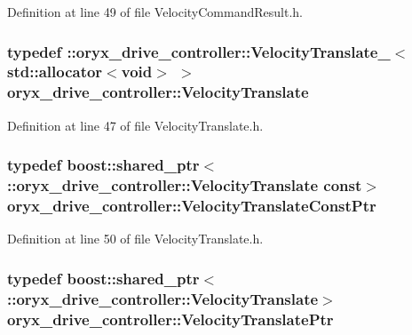 \-Definition at line 49 of file \-Velocity\-Command\-Result.\-h.

\subsubsection[{\-Velocity\-Translate}]{\setlength{\rightskip}{0pt plus 5cm}typedef \-::{\bf oryx\-\_\-drive\-\_\-controller\-::\-Velocity\-Translate\-\_\-}$<$std\-::allocator$<$void$>$ $>$ {\bf oryx\-\_\-drive\-\_\-controller\-::\-Velocity\-Translate}}\label{namespaceoryx__drive__controller_ad13b4105d91451512c0f16674d209a41}


\-Definition at line 47 of file \-Velocity\-Translate.\-h.

\subsubsection[{\-Velocity\-Translate\-Const\-Ptr}]{\setlength{\rightskip}{0pt plus 5cm}typedef boost\-::shared\-\_\-ptr$<$ \-::{\bf oryx\-\_\-drive\-\_\-controller\-::\-Velocity\-Translate} const$>$ {\bf oryx\-\_\-drive\-\_\-controller\-::\-Velocity\-Translate\-Const\-Ptr}}\label{namespaceoryx__drive__controller_a08f44e7cdd4ff4146f607fb97b53cd53}


\-Definition at line 50 of file \-Velocity\-Translate.\-h.

\subsubsection[{\-Velocity\-Translate\-Ptr}]{\setlength{\rightskip}{0pt plus 5cm}typedef boost\-::shared\-\_\-ptr$<$ \-::{\bf oryx\-\_\-drive\-\_\-controller\-::\-Velocity\-Translate}$>$ {\bf oryx\-\_\-drive\-\_\-controller\-::\-Velocity\-Translate\-Ptr}}\label{namespaceoryx__drive__controller_a68b9d0368e3ada2d59b13cc8258d135b}


